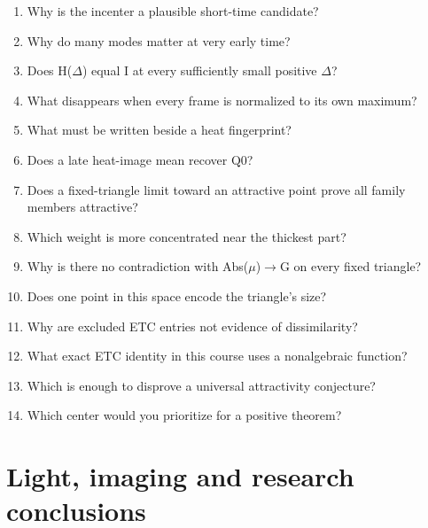 \documentclass[11pt,oneside,openany]{book}
\begin{document}
\begin{enumerate}

\item\label{ex:62} Why is the incenter a plausible short-time candidate?

\item\label{ex:63} Why do many modes matter at very early time?

\item\label{ex:64} Does H(\ensuremath{\Delta}) equal I at every sufficiently small positive \ensuremath{\Delta}?

\item\label{ex:65} What disappears when every frame is normalized to its own maximum?

\item\label{ex:66} What must be written beside a heat fingerprint?

\item\label{ex:67} Does a late heat-image mean recover $\mathrm{Q0}$?

\item\label{ex:68} Does a fixed-triangle limit toward an attractive point prove all family members attractive?

\item\label{ex:69} Which weight is more concentrated near the thickest part?

\item\label{ex:70} Why is there no contradiction with Abs(\ensuremath{\mu})\ensuremath{\to}G on every fixed triangle?

\item\label{ex:71} Does one point in this space encode the triangle's size?

\item\label{ex:72} Why are excluded ETC entries not evidence of dissimilarity?

\item\label{ex:73} What exact ETC identity in this course uses a nonalgebraic function?

\item\label{ex:74} Which is enough to disprove a universal attractivity conjecture?

\item\label{ex:75} Which center would you prioritize for a positive theorem?

\end{enumerate}

\chapter{Light, imaging and research conclusions}\label{ch:6}
\end{document}

